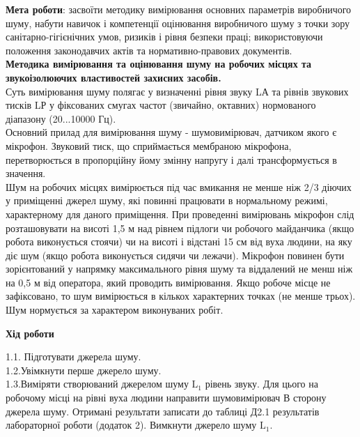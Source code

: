\documentclass[a4paper,14pt]{extreport}
\begin{document}
\textbf{Мета роботи}: засвоїти методику вимірювання основних параметрів виробничого шуму, набути навичок і компетенції оцінювання виробничого шуму з точки зору санітарно-гігієнічних умов, ризиків і рівня безпеки праці; використовуючи положення законодавчих актів та нормативно-правових документів.\\


\textbf{Методика вимірювання та оцінювання шуму на робочих місцях та звукоізолюючих властивостей захисних засобів.}\\
Суть вимірювання шуму полягає у визначенні рівня звуку LА та рівнів звукових тисків LР у фіксованих смугах частот (звичайно, октавних) нормованого діапазону (20...10000 Гц).\\

Основний прилад для вимірювання шуму - шумовимірювач, датчиком якого є мікрофон. Звуковий тиск, що сприймається мембраною мікрофона, перетворюється в пропорційну йому змінну напругу і далі трансформується в значення.\\
Шум на робочих місцях вимірюється під час вмикання не менше ніж 2/3 діючих у приміщенні джерел шуму, які повинні працювати в нормальному режимі, характерному для даного приміщення. При проведенні вимірювань мікрофон слід розташовувати на висоті 1,5 м над рівнем підлоги чи робочого майданчика (якщо робота виконується стоячи) чи на висоті і відстані 15 см від вуха людини, на яку діє шум (якщо робота виконується сидячи чи лежачи). Мікрофон повинен бути зорієнтований у напрямку максимального рівня шуму та віддалений не менш ніж на 0,5 м від оператора, який проводить вимірювання. Якщо робоче місце не зафіксовано, то шум вимірюється в кількох характерних точках (не менше трьох).\\

Шум нормується за характером виконуваних робіт.

\begin{center}\textbf{Хід роботи}\end{center}
\par
1.1. Підготувати джерела шуму.\\

1.2.Увімкнути перше джерело шуму.\\

1.3.Виміряти створюваний джерелом шуму $\mathrm{L}_{1}$ рівень звуку. Для цього на робочому місці на рівні вуха людини направити шумовимірювач В сторону джерела шуму. Отримані результати записати до таблиці Д2.1 результатів лабораторної роботи (додаток 2). Вимкнути джерело шуму $\mathrm{L}_{1} .$\\
\end{document}

